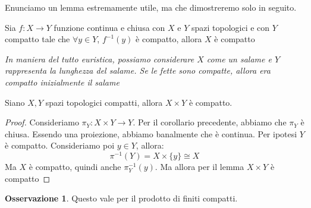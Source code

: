 \documentclass[11pt,a4paper,twoside]{article}
\theoremstyle{definition}
\newtheorem*{oss}{Osservazione}
\begin{document}
Enunciamo un lemma estremamente utile, ma che dimostreremo solo in seguito.

\begin{lemma}{}{}
	Sia $f:X \to Y$ funzione continua e chiusa con $X$ e $Y$ spazi topologici e con $Y$ compatto tale che $\forall y \in Y$, $f^{-1}(y)$ è compatto, allora $X$ è compatto
\end{lemma}

\textit{In maniera del tutto euristica, possiamo considerare $X$ come un salame e $Y$ rappresenta la lunghezza del salame. Se le fette sono compatte, allora era compatto inizialmente il salame}

\begin{prop}{}{}
	Siano $X,Y$ spazi topologici compatti, allora $X \times Y$ è compatto.
\end{prop}

\begin{proof}{}{}
	Consideriamo $\pi_Y: X \times Y \to Y$. Per il corollario precedente, abbiamo che $\pi_Y$ è chiusa. Essendo una proiezione, abbiamo banalmente che è continua. Per ipotesi $Y$ è compatto. Consideriamo poi $y \in Y$, allora:
	\[ \pi^{-1}(Y) = X \times \{y\} \cong X \]
	Ma $X$ è compatto, quindi anche $\pi_Y^{-1}(y)$. Ma allora per il lemma $X \times Y$ è compatto
\end{proof}

\begin{oss}
	Questo vale per il prodotto di finiti compatti.
\end{oss}
\end{document}
